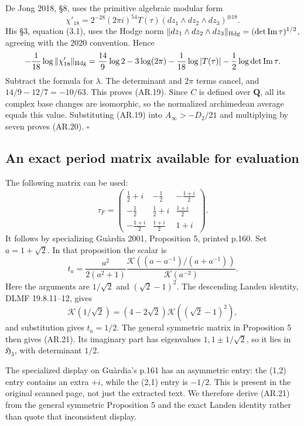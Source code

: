 \documentclass[11pt,a4paper]{article}
\begin{document}
De Jong 2018, §8, uses the primitive algebraic modular form \[
\chi'_{18}=2^{-28}(2\pi i)^{54}T(\tau)
           (dz_1\wedge dz_2\wedge dz_3)^{\otimes18}.
\] His §3, equation (3.1), uses the Hodge norm
\(\|dz_1\wedge dz_2\wedge dz_3\|_{\rm Hdg}
=(\det\operatorname{Im}\tau)^{1/2}\), agreeing with the 2020 convention.
Hence \[
-\frac1{18}\log\|\chi'_{18}\|_{\rm Hdg}
=\frac{14}{9}\log2-3\log(2\pi)
 -\frac1{18}\log|T(\tau)|
 -\frac12\log\det\operatorname{Im}\tau.
\] Subtract the formula for \(\lambda\). The determinant and \(2\pi\)
terms cancel, and \(14/9-12/7=-10/63\). This proves (AR.19). Since \(C\)
is defined over \(\mathbf Q\), all its complex base changes are
isomorphic, so the normalized archimedean average equals this value.
Substituting (AR.19) into \(A_\infty>-D_2/21\) and multiplying by seven
proves (AR.20). \(\square\)

\subsection{An exact period matrix available for
evaluation}\label{an-exact-period-matrix-available-for-evaluation}

The following matrix can be used: \[
\tau_F=
\begin{pmatrix}
\frac12+i&-\frac12&-\frac{1+i}{2}\\
-\frac12&\frac12+i&\frac{1+i}{2}\\
-\frac{1+i}{2}&\frac{1+i}{2}&1+i
\end{pmatrix}.
\tag{AR.21}
\] It follows by specializing Guàrdia 2001, Proposition 5, printed
p.160. Set \(a=1+\sqrt2\). In that proposition the scalar is \[
t_a=\frac{a^2}{2(a^2+1)}
\frac{\mathcal K((a-a^{-1})/(a+a^{-1}))}{\mathcal K(a^{-2})}.
\] Here the arguments are \(1/\sqrt2\) and \((\sqrt2-1)^2\). The
descending Landen identity, DLMF 19.8.11--12, gives \[
\mathcal K(1/\sqrt2)
=(4-2\sqrt2)\mathcal K((\sqrt2-1)^2),
\] and substitution gives \(t_a=1/2\). The general symmetric matrix in
Proposition 5 then gives (AR.21). Its imaginary part has eigenvalues
\(1,1\pm1/\sqrt2\), so it lies in \(\mathfrak H_3\), with determinant
\(1/2\).

The specialized display on Guàrdia's p.161 has an asymmetric entry: the
(1,2) entry contains an extra \(+i\), while the (2,1) entry is \(-1/2\).
This is present in the original scanned page, not just the extracted
text. We therefore derive (AR.21) from the general symmetric Proposition
5 and the exact Landen identity rather than quote that inconsistent
display.
\end{document}
